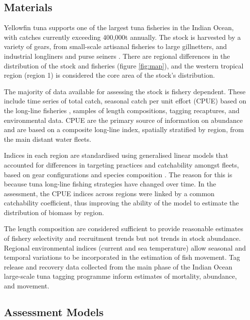 \documentclass[12pt,halfline,a4paper,nonumbib]{ouparticle}
\begin{document}
\subsection{Materials}

Yellowfin tuna supports one of the largest tuna fisheries in the Indian Ocean, with catches currently exceeding 400,000t annually. The stock is harvested by a variety of gears, from small-scale artisanal fisheries to large gillnetters, and industrial longliners and purse seiners \parencite{fiorellato2019tt}.
There are regional differences in the distribution of the stock and fisheries (figure \ref{fig:map}), and the  western tropical region (region 1) is considered the core area of the stock's distribution.

The majority of data available for assessing the stock is fishery dependent. These include time series of total catch, seasonal catch per unit effort (CPUE) based on the long-line fisheries \parencite{hoyle2020scaling}, samples of length compositions, tagging recaptures, and environmental data. CPUE are the primary source of information on abundance and are based on a composite long-line index,  spatially stratified by region, from the main distant water fleets. %

Indices in each region are standardised using generalised linear models that accounted for differences in targeting practices and catchability amongst fleets, based on gear configurations and species composition \parencite{hoyle2020scaling}. The reason for this is because tuna long-line fishing strategies have changed over time. %
In the assessment, the CPUE indices across regions were linked by a common catchability coefficient, thus improving the ability of the model to estimate the distribution of biomass by region. %

The length composition are considered sufficient to provide reasonable estimates of fishery selectivity and recruitment trends but not trends in stock abundance. Regional environmental indices (current and sea temperature) allow seasonal and temporal variations to be incorporated in the estimation of fish movement. Tag release and recovery data collected from the main phase of the Indian Ocean large-scale tuna tagging programme %
inform estimates of mortality, abundance, and movement. 


\subsection{Assessment Models}
\end{document}
